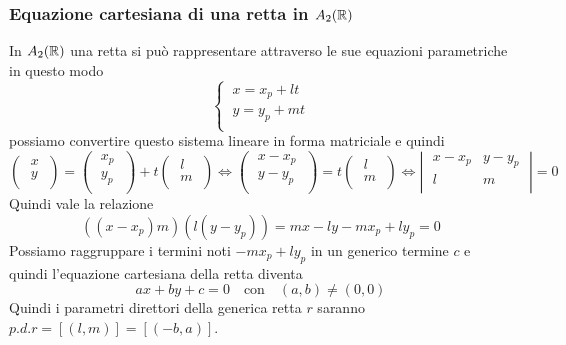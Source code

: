 \documentclass[twoside]{report}
\begin{document}
\subsubsection{Equazione cartesiana di una retta in \(A_2(\RR )\)}
In \(A_2(\RR )\) una retta si può rappresentare attraverso le sue equazioni parametriche in questo modo \[
\begin{cases}
    \ x = x_p + lt \\
    \ y = y_p + mt \\
\end{cases}
\] possiamo convertire questo sistema lineare in forma matriciale e quindi \[
\left( \;
\begin{matrix}
    x \\
    y \\
\end{matrix} \;
\right) = 
\left( \; \begin{matrix}
    x_p \\
    y_p \\
\end{matrix} \; \right) +
t  
\left( \; \begin{matrix}
    l \\
    m \\
\end{matrix} \; \right) \iff 
\left( \; \begin{matrix}
    x - x_p \\
    y - y_p \\
\end{matrix} \; \right) = t
\left( \; \begin{matrix}
    l \\
    m \\
\end{matrix} \; \right) \iff 
\left| \;
\begin{matrix}
    x - x_p & y - y_p \\
    l & m \\
\end{matrix} \;
\right| = 0
\] 
Quindi vale la relazione \[
    ((x-x_p) m) (l (y-y_p)) = mx - ly -mx_p + ly_p = 0
\] Possiamo raggruppare i termini noti \(-mx_p + ly_p\) in un generico termine \(c\) e quindi l'equazione cartesiana della retta diventa \[
ax + by + c = 0 \quad \text{con}\quad (a,b) \neq (0,0)
\] Quindi i parametri direttori della generica retta \(r\) saranno \(p.d.r = [(l,m)] = [(-b, a)]\).
\end{document}
